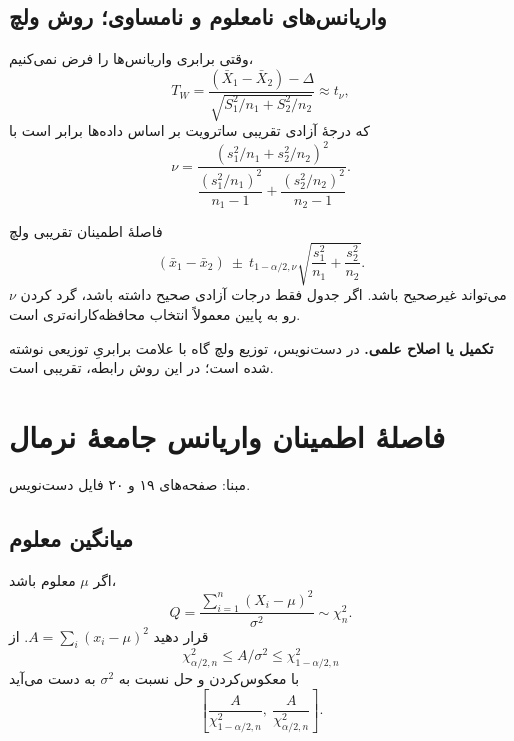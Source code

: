 \documentclass[12pt,a4paper,oneside]{report}
\newcounter{ex}[chapter]
\newcommand{\edit}[1]{\par\begingroup\small\color{alert}\textbf{تکمیل یا اصلاح علمی.} #1\par\endgroup}
\newcommand{\source}[1]{\par{\small\color{muted} مبنا: صفحه‌های #1 فایل دست‌نویس.}\par}
\begin{document}
\subsection{واریانس‌های نامعلوم و نامساوی؛ روش ولچ}
وقتی برابری واریانس‌ها را فرض نمی‌کنیم،
\[
T_W=\frac{(\bar X_1-\bar X_2)-\Delta}
{\sqrt{S_1^2/n_1+S_2^2/n_2}}
\approx t_\nu,
\]
که درجهٔ آزادی تقریبی ساترویت بر اساس داده‌ها برابر است با
\[
\nu=\frac{(s_1^2/n_1+s_2^2/n_2)^2}
{\dfrac{(s_1^2/n_1)^2}{n_1-1}+\dfrac{(s_2^2/n_2)^2}{n_2-1}}.
\]
\begin{result}{فاصلهٔ اطمینان تقریبی ولچ}
\[
\boxed{(\bar x_1-\bar x_2)\ \pm\ t_{1-\alpha/2,\nu}
\sqrt{\frac{s_1^2}{n_1}+\frac{s_2^2}{n_2}}.}
\]
$\nu$ می‌تواند غیرصحیح باشد. اگر جدول فقط درجات آزادی صحیح داشته باشد، گرد کردن رو به پایین معمولاً انتخاب محافظه‌کارانه‌تری است.
\end{result}
\edit{در دست‌نویس، توزیع ولچ گاه با علامت برابریِ توزیعی نوشته شده است؛ در این روش رابطه، تقریبی است.}
\section{فاصلهٔ اطمینان واریانس جامعهٔ نرمال}
\source{۱۹ و ۲۰}
\subsection{میانگین معلوم}
اگر $\mu$ معلوم باشد،
\[
Q=\frac{\sum_{i=1}^n(X_i-\mu)^2}{\sigma^2}\sim\chi^2_n.
\]
قرار دهید $A=\sum_i(x_i-\mu)^2$. از
\[\chi^2_{\alpha/2,n}\le A/\sigma^2\le\chi^2_{1-\alpha/2,n}\]
با معکوس‌کردن و حل نسبت به $\sigma^2$ به دست می‌آید
\[
\boxed{\left[\frac{A}{\chi^2_{1-\alpha/2,n}},\
\frac{A}{\chi^2_{\alpha/2,n}}\right].}
\]
\end{document}
